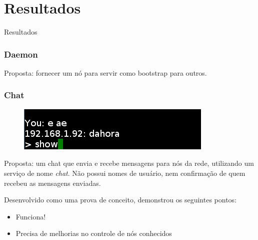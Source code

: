 \documentclass[brazil]{beamer}
\begin{document}
\section{Resultados}
\begin{frame}
  \begin{center}
    \huge{Resultados}
  \end{center}
\end{frame}
\begin{frame}
  \frametitle{Daemon}
  
  
  \vspace{10pt}
  
  Proposta: fornecer um nó para servir como bootstrap para outros.
  
\end{frame}
\begin{frame}
  \frametitle{Chat}
  
  \begin{figure}
  \includegraphics{chat.png}
  \end{figure}
  
  \pause
  
  Proposta: um chat que envia e recebe mensagens para nós da rede, utilizando
  um serviço de nome \textit{chat}. Não possui nomes de usuário, nem confirmação
  de quem recebeu as mensagens enviadas.
  
  \vspace{10pt}
  \pause
 
  Desenvolvido como uma prova de conceito, demonstrou os seguintes pontos:
  \begin{itemize}
    \pause
    \item Funciona!
    \pause
    \item Precisa de melhorias no controle de nós conhecidos
  \end{itemize}
\end{frame}
\end{document}
